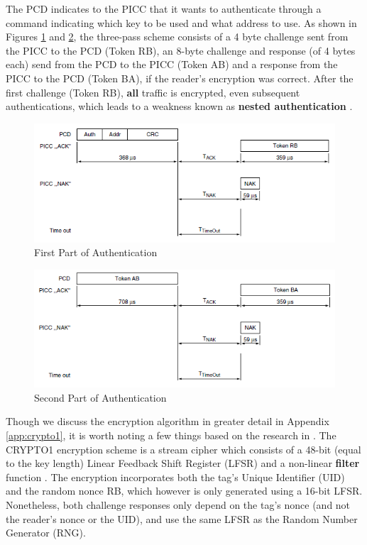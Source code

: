 \documentclass[fleqn,10pt]{SelfArx} %
\begin{document}
The PCD indicates to the PICC that it wants to authenticate through a command indicating which key to be used and what address to use. As shown in Figures \ref{fig:auth1} and \ref{fig:auth2}, the three-pass scheme consists of a 4 byte challenge sent from the PICC to the PCD  (Token RB), an 8-byte challenge and response (of 4 bytes each) send from the PCD to the PICC (Token AB) and a response from the PICC to the PCD (Token BA), if the reader's encryption was correct. After the first challenge (Token RB), {\bf all} traffic is encrypted, even subsequent authentications, which leads to a weakness known as {\bf nested authentication} \cite{classicvulnerabilities}.

\begin{figure}[h]
  \includegraphics[width=\linewidth]{img/auth1.png}
  \caption{First Part of Authentication \cite{classic1k}}
  \label{fig:auth1}
\end{figure}

\begin{figure}[h]
  \includegraphics[width=\linewidth]{img/auth2.png}
  \caption{Second Part of Authentication \cite{classic1k}}
  \label{fig:auth2}
\end{figure}

Though we discuss the encryption algorithm in greater detail in Appendix \ref{app:crypto1}, it is worth noting a few things based on the research in \cite{crypto1, classicvulnerabilities}. The CRYPTO1 encryption scheme is a stream cipher which consists of a 48-bit (equal to the key length) Linear Feedback Shift Register (LFSR) and a non-linear {\bf filter} function \cite{crypto1}. The encryption incorporates both the tag's Unique Identifier (UID) and the random nonce RB, which however is only generated using a 16-bit LFSR. Nonetheless, both challenge responses only depend on the tag's nonce (and not the reader's nonce or the UID), and use the same LFSR as the Random Number Generator (RNG). 
\end{document}
